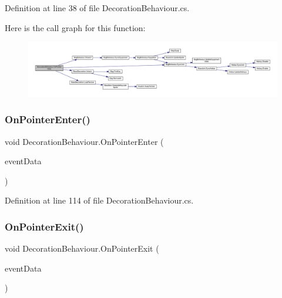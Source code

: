 Definition at line 38 of file Decoration\+Behaviour.\+cs.

Here is the call graph for this function\+:
\nopagebreak
\begin{figure}[H]
\begin{center}
\leavevmode
\includegraphics[width=350pt]{class_decoration_behaviour_a94a1b5e492f096e3f121d05105e16c37_cgraph}
\end{center}
\end{figure}
\mbox{\label{class_decoration_behaviour_abc5e3d4f07a6da052203565037d8b535}} 
\subsubsection{\texorpdfstring{OnPointerEnter()}{OnPointerEnter()}}
{\footnotesize\ttfamily void Decoration\+Behaviour.\+On\+Pointer\+Enter (\begin{DoxyParamCaption}\item[{Pointer\+Event\+Data}]{event\+Data }\end{DoxyParamCaption})}



Definition at line 114 of file Decoration\+Behaviour.\+cs.

\mbox{\label{class_decoration_behaviour_a7c33b0d7ccac7ff55a4acb49b6fa3c83}} 
\subsubsection{\texorpdfstring{OnPointerExit()}{OnPointerExit()}}
{\footnotesize\ttfamily void Decoration\+Behaviour.\+On\+Pointer\+Exit (\begin{DoxyParamCaption}\item[{Pointer\+Event\+Data}]{event\+Data }\end{DoxyParamCaption})}



